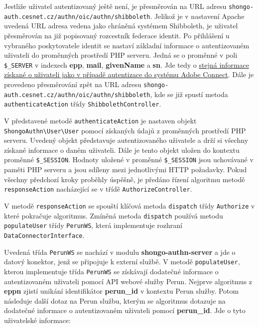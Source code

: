 \documentclass[
  printed, %
  twoside, %
  table,   %
  nolof,     %
  nolot,     %
]{fithesis3}
\begin{document}
Jestliže uživatel autentizovaný ještě není, je přesměrován na URL adresu \texttt{shongo-auth.cesnet.cz/authn/oic/authn/shibboleth}. Jelikož je v nastavení Apache uvedená URL adresa vedena jako chráněná systémem Shibboleth, je uživatel přesměrován na již popisovaný rozcestník federace identit. Po přihlášení u vybraného poskytovatele identit se nastaví základní informace o autentizovaném uživateli do proměnných prostředí PHP serveru. Jedná se o proměnné v poli \texttt{\$\_SERVER} v indexech \textbf{epp}, \textbf{mail}, \textbf{givenName} a \textbf{sn}. Jde tedy o \hyperref[item:adobe-connect]{stejná informace získané o uživateli jako  v případě autentizace do systému Adobe Connect}. Dále je provedeno přesměrování zpět na URL adresu \texttt{shongo-auth.cesnet.cz/authn/oic/authn/shibboleth}, kde se již spustí metoda \texttt{authenticateAction} třídy \texttt{ShibbolethController}. \par

V představené metodě \texttt{authenticateAction} je nastaven objekt \texttt{ShongoAuthn\textbackslash User\textbackslash User} pomocí získaných údajů z proměnných prostředí PHP serveru. Uvedený objekt představuje autentizovaného uživatele a drží si všechny získané informace o daném uživateli. Dále je tento objekt uložen do kontextu proměnné \texttt{\$\_SESSION}. Hodnoty uložené v proměnné \texttt{\$\_SESSION} jsou uchovávané v paměti PHP serveru a jsou sdíleny mezi jednotlivými HTTP požadavky. Pokud všechny předchozí kroky proběhly úspěšně, je předáno řízení algoritmu metodě \texttt{responseAction} nacházející se v třídě \texttt{AuthorizeController}. \par

\label{sec:responseAction}
V metodě \texttt{responseAction} se spouští klíčová metoda \texttt{dispatch} třídy \texttt{Authorize} v které pokračuje algoritmus. Zmíněná metoda \texttt{dispatch} používá metodu \texttt{populateUser} třídy \texttt{PerunWS}, která implementuje rozhraní \texttt{DataConnectorInterface}. \par

Uvedená třída \texttt{PerunWS} se nachází v modulu \textbf{shongo-authn-server} a jde o datový konektor, jenž se připojuje k externí službě. V metodě \texttt{populateUser}, kterou implementuje třída \texttt{PerunWS} se získávají dodatečné informace o autentizovaném uživateli pomocí API webové služby Perun. Nejprve algoritmus z \textbf{eppn} zjistí unikání identifikátor \textbf{perun\_id} v kontextu Perun služby. Potom následuje další dotaz na Perun službu, kterým se algoritmus dotazuje na dodatečné informace o autentizovaném uživateli pomocí \textbf{perun\_id}. Jde o tyto uživatelské informace:
\end{document}
